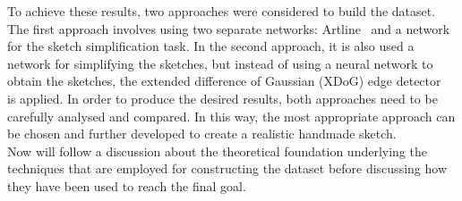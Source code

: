 \noindent To achieve these results, two approaches were considered to build the dataset. The first approach involves using two separate networks: Artline~\cite{artline} and a network for the sketch simplification task. In the second approach, it is also used a network for simplifying the sketches, but instead of using a neural network to obtain the sketches, the extended difference of Gaussian (XDoG) edge detector~\cite{xdog} is applied.
In order to produce the desired results, both approaches need to be carefully analysed and compared. In this way, the most appropriate approach can be chosen and further developed to create a realistic handmade sketch.\\
Now will follow a discussion about the theoretical foundation underlying the techniques that are employed for constructing the dataset before discussing how they have been used to reach the final goal.

